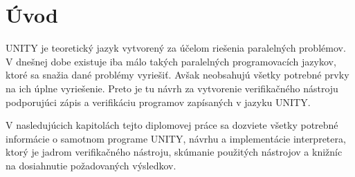 \chapter{Úvod}\label{chap:intro}
UNITY je teoretický jazyk vytvorený za účelom riešenia paralelných problémov. V dnešnej 
dobe existuje iba málo takých paralelných programovacích jazykov, ktoré sa snažia 
dané problémy vyriešiť. Avšak neobsahujú všetky potrebné prvky na ich úplne vyriešenie. 
Preto je tu návrh za vytvorenie verifikačného nástroju podporujúci zápis a 
verifikáciu programov zapísaných v jazyku UNITY. 

V nasledujúcich kapitolách tejto diplomovej práce sa dozviete všetky potrebné 
informácie o samotnom programe UNITY, návrhu a implementácie interpretera, ktorý je 
jadrom verifikačného nástroju, skúmanie použitých nástrojov a knižníc na dosiahnutie 
požadovaných výsledkov.